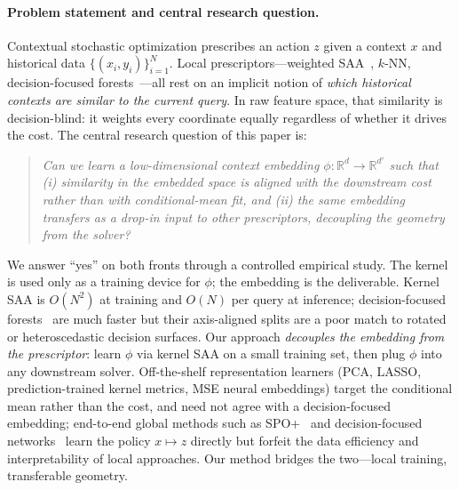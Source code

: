\documentclass[11pt]{article}
\begin{document}
\paragraph{Problem statement and central research question.}
Contextual stochastic optimization prescribes an action $z$ given a context $x$ and historical data $\{(x_i,y_i)\}_{i=1}^N$. Local prescriptors---weighted SAA~\cite{bertsimas2020predictive}, $k$-NN, decision-focused forests~\cite{kallus2023sof}---all rest on an implicit notion of \emph{which historical contexts are similar to the current query}. In raw feature space, that similarity is decision-blind: it weights every coordinate equally regardless of whether it drives the cost. The central research question of this paper is:
\begin{quote}
\emph{Can we learn a low-dimensional context embedding $\phi:\mathbb R^d\to\mathbb R^{d'}$ such that (i) similarity in the embedded space is aligned with the downstream cost rather than with conditional-mean fit, and (ii) the same embedding transfers as a drop-in input to other prescriptors, decoupling the geometry from the solver?}
\end{quote}
We answer ``yes'' on both fronts through a controlled empirical study. The kernel is used only as a training device for $\phi$; the embedding is the deliverable. Kernel SAA is $O(N^2)$ at training and $O(N)$ per query at inference; decision-focused forests~\cite{kallus2023sof} are much faster but their axis-aligned splits are a poor match to rotated or heteroscedastic decision surfaces. Our approach \emph{decouples the embedding from the prescriptor}: learn $\phi$ via kernel SAA on a small training set, then plug $\phi$ into any downstream solver. Off-the-shelf representation learners (PCA, LASSO, prediction-trained kernel metrics, MSE neural embeddings) target the conditional mean rather than the cost, and need not agree with a decision-focused embedding; end-to-end global methods such as SPO+~\cite{elmachtoub2022smart} and decision-focused networks~\cite{donti2017task,wilder2019melding} learn the policy $x\mapsto z$ directly but forfeit the data efficiency and interpretability of local approaches. Our method bridges the two---local training, transferable geometry.
\end{document}
